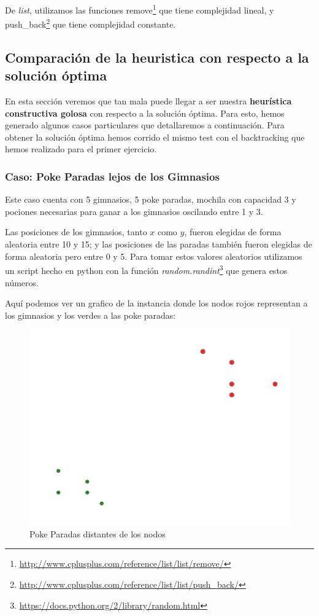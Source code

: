 De \emph{list}, utilizamos las funciones remove\footnote{\url{http://www.cplusplus.com/reference/list/list/remove/}} que tiene complejidad lineal, y push\_back\footnote{\url{http://www.cplusplus.com/reference/list/list/push_back/}} que tiene complejidad constante.


\subsection{Comparación de la heuristica con respecto a la solución óptima}

En esta sección veremos que tan mala puede llegar a ser nuestra \textbf{heurística constructiva golosa} con respecto a la solución óptima. Para esto, hemos generado algunos casos particulares que detallaremos a continuación. Para obtener la solución óptima hemos corrido el mismo test con el backtracking que hemos realizado para el primer ejercicio.

\subsubsection{Caso: Poke Paradas lejos de los Gimnasios}

Este caso cuenta con 5 gimnasios, 5 poke paradas, mochila con capacidad 3 y pociones necesarias para ganar a los gimnasios oscilando entre 1 y 3.

Las posiciones de los gimnasios, tanto $x$ como $y$, fueron elegidas de forma aleatoria entre 10 y 15; y las posiciones de las paradas también fueron elegidas de forma aleatoria pero entre 0 y 5. Para tomar estos valores aleatorios utilizamos un script hecho en python con la función \textit{random.randint}\footnote{\url{https://docs.python.org/2/library/random.html}} que genera estos números.

Aquí podemos ver un grafico de la instancia donde los nodos rojos representan a los gimnasios y los verdes a las poke paradas:

\begin{figure}[H]
  \begin{center}
    \includegraphics[scale=0.4]{imagenes/test1.pdf}
    \caption{Poke Paradas distantes de los nodos}
    \label{fig:ej2_caso1}
  \end{center}
\end{figure}


